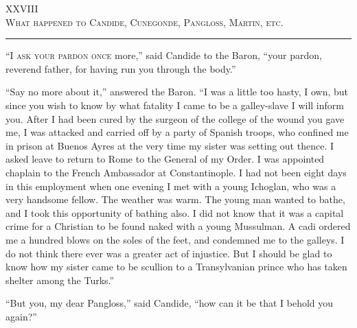 \begin{center}
XXVIII\\
\textsc{What happened to Candide, Cunegonde, Pangloss, Martin, etc.}
\end{center}
\vspace{-0.5cm}
\rule{\textwidth}{0.5pt}

\lettrine{``I}{ ask your pardon once} more,'' said Candide to the Baron, ``your pardon, reverend father, for having run you through the body.''

``Say no more about it,'' answered the Baron. ``I was a little too hasty, I own, but since you wish to know by what fatality I came to be a galley-slave I will inform you. After I had been cured by the surgeon of the college of the wound you gave me, I was attacked and carried off by a party of Spanish troops, who confined me in prison at Buenos Ayres at the very time my sister was setting out thence. I asked leave to return to Rome to the General of my Order. I was appointed chaplain to the French Ambassador at Constantinople. I had not been eight days in this employment when one evening I met with a young Ichoglan, who was a very handsome fellow. The weather was warm. The young man wanted to bathe, and I took this opportunity of bathing also. I did not know that it was a capital crime for a Christian to be found naked with a young Mussulman. A cadi ordered me a hundred blows on the soles of the feet, and condemned me to the galleys. I do not think there ever was a greater act of injustice. But I should be glad to know how my sister came to be scullion to a Transylvanian prince who has taken shelter among the Turks.''

``But you, my dear Pangloss,'' said Candide, ``how can it be that I behold you again?''

